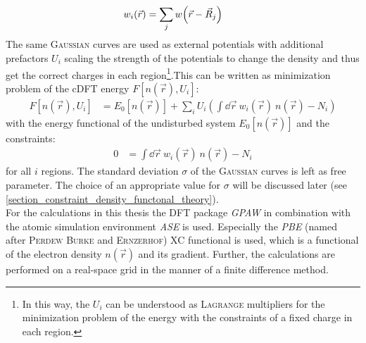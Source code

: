 \begin{align}
w_i\left(\vec{r}\right) &= \sum_j w\left(\vec{r} - \vec{R}_j\right) \text{\quad}
\end{align}
The same \textsc{Gaussian} curves are used as external potentials with additional prefactors $U_i$ scaling the strength of the potentials to change the density and thus get the correct charges in each region\footnote{In this way, the $U_i$ can be understood as \textsc{Lagrange} multipliers for the minimization problem of the energy with the constraints of a fixed charge in each region.}.This can be written as minimization problem of the cDFT energy $F[n\left(\vec{r}\right), U_i]$:
\begin{align}
F\left[n\left(\vec{r}\right), U_i\right] &= E_0\left[n\left(\vec{r}\right)\right] + \sum_i U_i\left(\int\dd\vec{r}\ w_i\left(\vec{r}\right)\ n\left(\vec{r}\right) - N_i\right)
\end{align}
with the energy functional of the undisturbed system $E_0\left[n\left(\vec{r}\right)\right]$ and the constraints:
\begin{align}
0 &= \int\dd\vec{r}\ w_i\left(\vec{r}\right)\ n\left(\vec{r}\right) - N_i
\end{align}
for all $i$ regions. The standard deviation $\sigma$ of the \textsc{Gaussian} curves is left as free parameter. The choice of an appropriate value for $\sigma$ will be discussed later (see \cref{section_constraint_density_functonal_theory}).\\
For the calculations in this thesis the DFT package \emph{GPAW} \cite{GPAW1, GPAW2} in combination with the atomic simulation environment \emph{ASE} \cite{ASE} is used. Especially the \emph{PBE} (named after \textsc{Perdew Burke} and \mbox{\textsc{Ernzerhof}}) XC functional is used, which is a functional of the electron density $n\left(\vec{r}\right)$  and its gradient. Further, the calculations are performed on a real-space grid in the manner of a finite difference method.
